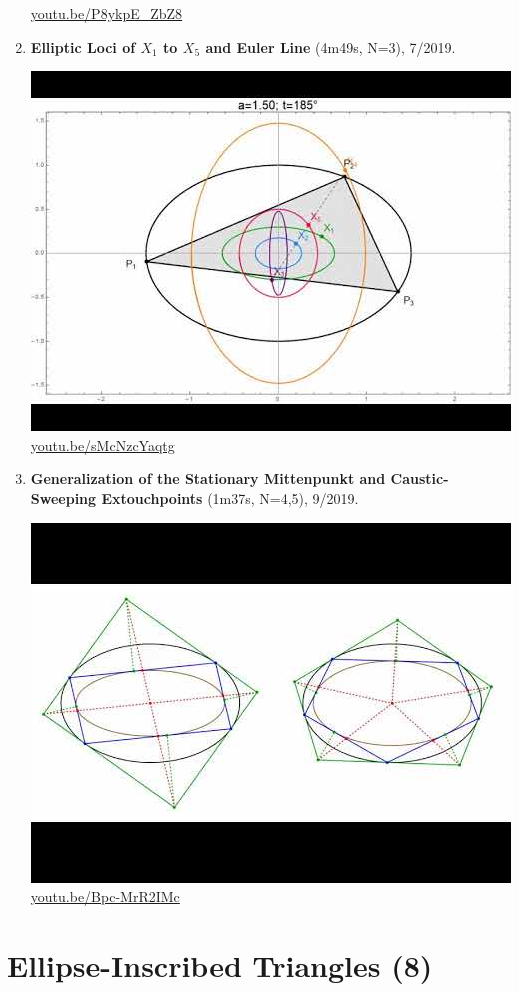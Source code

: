 \documentclass[12pt]{amsart}
\begin{document}
\begin{enumerate}[resume]
\begin{center}
\href{https://youtu.be/P8ykpE_ZbZ8}{\url{youtu.be/P8ykpE\_ZbZ8}}\end{center}
% 
\item \textbf{Elliptic Loci of $X_{1}$ to $X_{5}$ and Euler Line} (4m49s, N=3), 7/2019. 
\begin{center}\includegraphics[width=.5\textwidth]{pics/sMcNzcYaqtg.jpg} \\ 
\href{https://youtu.be/sMcNzcYaqtg}{\url{youtu.be/sMcNzcYaqtg}}\end{center}
% 
\item \textbf{Generalization of the Stationary Mittenpunkt and Caustic-Sweeping Extouchpoints} (1m37s, N=4,5), 9/2019. 
\begin{center}\includegraphics[width=.5\textwidth]{pics/Bpc-MrR2IMc.jpg} \\ 
\href{https://youtu.be/Bpc-MrR2IMc}{\url{youtu.be/Bpc-MrR2IMc}}\end{center}
% 
\end{enumerate}

\section{Ellipse-Inscribed Triangles (8)}
\end{document}
